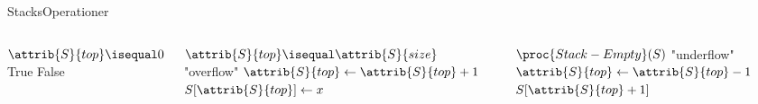 \documentclass[aspectratio=1610]{beamer}
\begin{document}
\begin{frame}{Stacks}{Operationer}
    \begin{columns}
        \begin{minipage}{\textwidth}
            \scriptsize
            \begin{tcolorbox}
                
                \vspace{-\abovedisplayskip}
                \begin{codebox}
                    \li \If $\attrib{S}{top} \isequal 0$
                        \Then
                    \li     \Return True
                    \li \Else \Return False
                \end{codebox}
            \end{tcolorbox}

            \begin{tcolorbox}
                
                \vspace{-\abovedisplayskip}
                \begin{codebox}
                    \li \If $\attrib{S}{top} \isequal \attrib{S}{size}$
                        \Then
                    \li \Error "overflow"
                    \li \Else
                    \li $\attrib{S}{top} \gets \attrib{S}{top} + 1$
                    \li $S[\attrib{S}{top}] \gets x$
                \end{codebox}
            \end{tcolorbox}

            \begin{tcolorbox}
                
                \vspace{-\abovedisplayskip}
                \begin{codebox}
                    \li \If $\proc{Stack-Empty}(S)$
                        \Then
                    \li \Error "underflow"
                    \li \Else
                    \li $\attrib{S}{top} \gets \attrib{S}{top} - 1$
                    \li \Return $S[\attrib{S}{top} + 1]$
                \end{codebox}
            \end{tcolorbox}
        \end{minipage}
    

\end{columns}
\end{frame}
\end{document}
